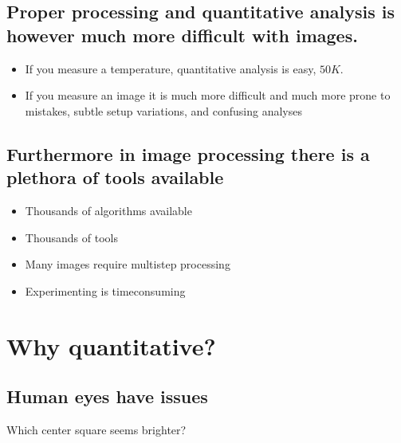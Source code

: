 \documentclass[letterpaper,10pt,english]{sphinxmanual}
\begin{document}
\subsection{Proper processing and quantitative analysis is however much more difficult with images.}
\label{\detokenize{01-Introduction:proper-processing-and-quantitative-analysis-is-however-much-more-difficult-with-images}}\begin{itemize}
\item {} 
\sphinxAtStartPar
If you measure a temperature, quantitative analysis is easy, \(50K\).

\item {} 
\sphinxAtStartPar
If you measure an image it is much more difficult and much more prone to mistakes, subtle setup variations, and confusing analyses

\end{itemize}


\subsection{Furthermore in image processing there is a plethora of tools available}
\label{\detokenize{01-Introduction:furthermore-in-image-processing-there-is-a-plethora-of-tools-available}}\begin{itemize}
\item {} 
\sphinxAtStartPar
Thousands of algorithms available

\item {} 
\sphinxAtStartPar
Thousands of tools

\item {} 
\sphinxAtStartPar
Many images require multi\sphinxhyphen{}step processing

\item {} 
\sphinxAtStartPar
Experimenting is time\sphinxhyphen{}consuming

\end{itemize}


\section{Why quantitative?}
\label{\detokenize{01-Introduction:why-quantitative}}

\subsection{Human eyes have issues}
\label{\detokenize{01-Introduction:human-eyes-have-issues}}
\sphinxAtStartPar
Which center square seems brighter?
\end{document}
